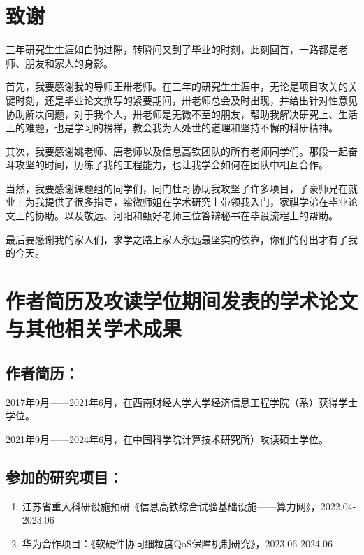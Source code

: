 \chapter[致谢]{致\quad 谢}%

三年研究生生涯如白驹过隙，转瞬间又到了毕业的时刻，此刻回首，一路都是老师、朋友和家人的身影。

首先，我要感谢我的导师王卅老师。在三年的研究生生涯中，无论是项目攻关的关键时刻，还是毕业论文撰写的紧要期间，卅老师总会及时出现，并给出针对性意见协助解决问题，对于我个人，卅老师是无微不至的朋友，帮助我解决研究上、生活上的难题，也是学习的榜样，教会我为人处世的道理和坚持不懈的科研精神。

其次，我要感谢姚老师、唐老师以及信息高铁团队的所有老师同学们。那段一起奋斗攻坚的时间，历练了我的工程能力，也让我学会如何在团队中相互合作。

当然，我要感谢课题组的同学们，同门杜哥协助我攻坚了许多项目，子豪师兄在就业上为我提供了很多指导，紫微师姐在学术研究上带领我入门，家祺学弟在毕业论文上的协助。以及敬远、河阳和甄好老师三位答辩秘书在毕设流程上的帮助。

最后要感谢我的家人们，求学之路上家人永远最坚实的依靠，你们的付出才有了我的今天。


\chapter{作者简历及攻读学位期间发表的学术论文与其他相关学术成果}

\section*{作者简历：}

2017年9月——2021年6月，在西南财经大学大学经济信息工程学院（系）获得学士学位。

2021年9月——2024年6月，在中国科学院计算技术研究所）攻读硕士学位。

\section*{参加的研究项目：}

\begin{enumerate}
    \item 江苏省重大科研设施预研《信息高铁综合试验基础设施——算力网》，2022.04-2023.06
    \item 华为合作项目：《软硬件协同细粒度QoS保障机制研究》，2023.06-2024.06
\end{enumerate}


\cleardoublepage[plain]%
